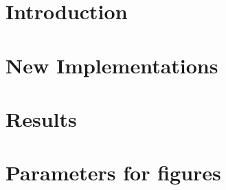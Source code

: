 \documentclass[hidelinks,oneside]{scrbook}			%
\begin{document}
\thispagestyle{empty} \clearpage										%
\pagestyle{plain}  %



\tableofcontents
\chapter{Introduction}


%
%
%
\chapter{New Implementations}





%
\chapter{Results}



\newpage

    

    
    

\newpage
\chapter*{Parameters for figures}

\newpage



 

%
\end{document}
